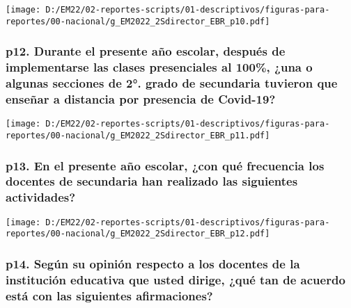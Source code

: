 \documentclass[
]{article}
\begin{document}
\texttt{[image: D:/EM22/02-reportes-scripts/01-descriptivos/figuras-para-reportes/00-nacional/g\_EM2022\_2Sdirector\_EBR\_p10.pdf]}

\hypertarget{p12.-durante-el-presente-auxf1o-escolar-despuuxe9s-de-implementarse-las-clases-presenciales-al-100-una-o-algunas-secciones-de-2.-grado-de-secundaria-tuvieron-que-enseuxf1ar-a-distancia-por-presencia-de-covid-19}{%
\subsubsection{p12. Durante el presente año escolar, después de
implementarse las clases presenciales al 100\%, ¿una o algunas secciones
de 2°. grado de secundaria tuvieron que enseñar a distancia por
presencia de
Covid-19?}\label{p12.-durante-el-presente-auxf1o-escolar-despuuxe9s-de-implementarse-las-clases-presenciales-al-100-una-o-algunas-secciones-de-2.-grado-de-secundaria-tuvieron-que-enseuxf1ar-a-distancia-por-presencia-de-covid-19}}

\texttt{[image: D:/EM22/02-reportes-scripts/01-descriptivos/figuras-para-reportes/00-nacional/g\_EM2022\_2Sdirector\_EBR\_p11.pdf]}

\hypertarget{p13.-en-el-presente-auxf1o-escolar-con-quuxe9-frecuencia-los-docentes-de-secundaria-han-realizado-las-siguientes-actividades}{%
\subsubsection{p13. En el presente año escolar, ¿con qué frecuencia los
docentes de secundaria han realizado las siguientes
actividades?}\label{p13.-en-el-presente-auxf1o-escolar-con-quuxe9-frecuencia-los-docentes-de-secundaria-han-realizado-las-siguientes-actividades}}

\texttt{[image: D:/EM22/02-reportes-scripts/01-descriptivos/figuras-para-reportes/00-nacional/g\_EM2022\_2Sdirector\_EBR\_p12.pdf]}

\hypertarget{p14.-seguxfan-su-opiniuxf3n-respecto-a-los-docentes-de-la-instituciuxf3n-educativa-que-usted-dirige-quuxe9-tan-de-acuerdo-estuxe1-con-las-siguientes-afirmaciones}{%
\subsubsection{p14. Según su opinión respecto a los docentes de la
institución educativa que usted dirige, ¿qué tan de acuerdo está con las
siguientes
afirmaciones?}\label{p14.-seguxfan-su-opiniuxf3n-respecto-a-los-docentes-de-la-instituciuxf3n-educativa-que-usted-dirige-quuxe9-tan-de-acuerdo-estuxe1-con-las-siguientes-afirmaciones}}
\end{document}
